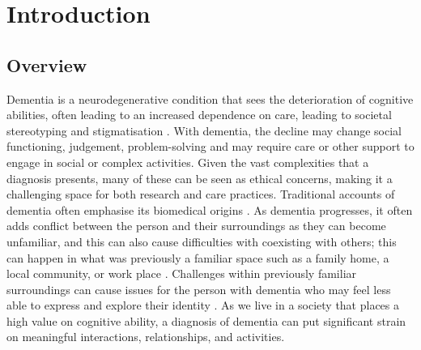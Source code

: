 \chapter{Introduction}

\section{Overview}
\label{Intro: Overiew}
Dementia is a neurodegenerative condition that sees the deterioration of cognitive abilities, often leading to an increased dependence on care, leading to societal stereotyping and stigmatisation \citep{herrmann_systematic_2018}. With dementia, the decline may change social functioning, judgement, problem-solving and may require care or other support to engage in social or complex activities. Given the vast complexities that a diagnosis presents, many of these can be seen as ethical concerns, making it a challenging space for both research and care practices. Traditional accounts of dementia often emphasise its biomedical origins \citep{leibing_annette_thinking_2006}. As dementia progresses, it often adds conflict between the person and their surroundings as they can become unfamiliar, and this can also cause difficulties with coexisting with others; this can happen in what was previously a familiar space such as a family home, a local community, or work place \citep{langdon_making_2007}. Challenges within previously familiar surroundings can cause issues for the person with dementia who may feel less able to express and explore their identity \citep{john_killick_claire_craig_creativity_2012, kontos_embodied_2005}. As we live in a society that places a high value on cognitive ability, a diagnosis of dementia can put significant strain on meaningful interactions, relationships, and activities. 


